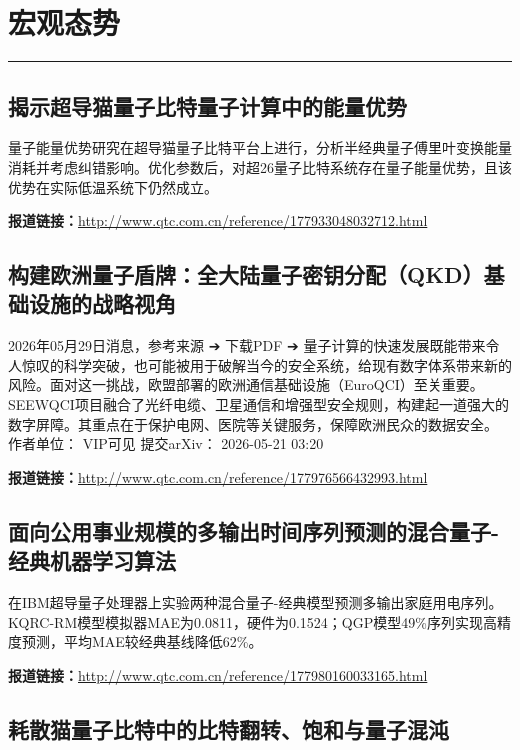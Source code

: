 \documentclass[12pt,a4paper]{ctexart}
\begin{document}
\newpage
\section{宏观态势}
\vspace{-0.5em}
\noindent\rule{\linewidth}{1.5pt}

\subsection{ 揭示超导猫量子比特量子计算中的能量优势 }

量子能量优势研究在超导猫量子比特平台上进行，分析半经典量子傅里叶变换能量消耗并考虑纠错影响。优化参数后，对超26量子比特系统存在量子能量优势，且该优势在实际低温系统下仍然成立。

\noindent\textbf{报道链接：}\url{http://www.qtc.com.cn/reference/177933048032712.html}

\subsection{ 构建欧洲量子盾牌：全大陆量子密钥分配（QKD）基础设施的战略视角 }

2026年05月29日消息，参考来源
➔
下载PDF
➔
量子计算的快速发展既能带来令人惊叹的科学突破，也可能被用于破解当今的安全系统，给现有数字体系带来新的风险。面对这一挑战，欧盟部署的欧洲通信基础设施（EuroQCI）至关重要。SEEWQCI项目融合了光纤电缆、卫星通信和增强型安全规则，构建起一道强大的数字屏障。其重点在于保护电网、医院等关键服务，保障欧洲民众的数据安全。
作者单位：
VIP可见
提交arXiv：
2026-05-21 03:20

\noindent\textbf{报道链接：}\url{http://www.qtc.com.cn/reference/177976566432993.html}

\subsection{ 面向公用事业规模的多输出时间序列预测的混合量子-经典机器学习算法 }

在IBM超导量子处理器上实验两种混合量子-经典模型预测多输出家庭用电序列。KQRC-RM模型模拟器MAE为0.0811，硬件为0.1524；QGP模型49\%序列实现高精度预测，平均MAE较经典基线降低62\%。

\noindent\textbf{报道链接：}\url{http://www.qtc.com.cn/reference/177980160033165.html}

\subsection{ 耗散猫量子比特中的比特翻转、饱和与量子混沌 }
\end{document}
